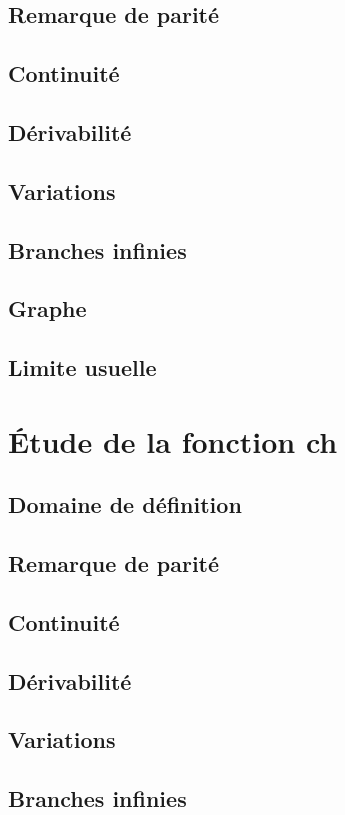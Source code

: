 \documentclass[12pt,a4paper,french]{book}
\begin{document}
		\subsection{Remarque de parité}
		\subsection{Continuité}
		\subsection{Dérivabilité}
		\subsection{Variations}
		\subsection{Branches infinies}
		\subsection{Graphe}
		\subsection{Limite usuelle}
	\section{Étude de la fonction ch}
		\subsection{Domaine de définition}
		\subsection{Remarque de parité}
		\subsection{Continuité}
		\subsection{Dérivabilité}
		\subsection{Variations}
		\subsection{Branches infinies}
\end{document}
